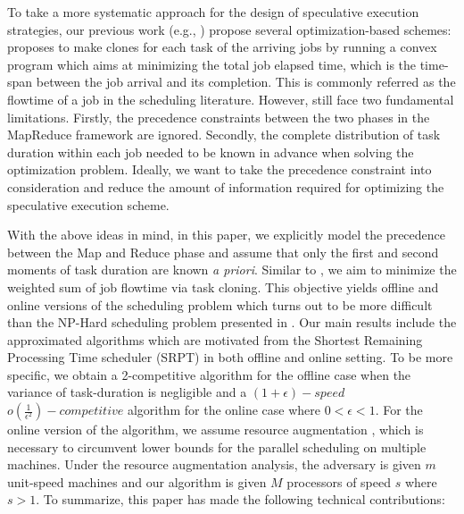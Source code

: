 \documentclass[10pt,conference,compsocconf,letterpaper]{IEEEtran}
\begin{document}
To take a more systematic
approach for the design of speculative execution strategies,
our previous work (e.g., \cite{speculative-single,speculative-single-optimization,speculative-multiple-optimization}) propose several optimization-based schemes:
 \cite{speculative-multiple-optimization} proposes to make clones for each task of the arriving jobs by running a convex program which aims at minimizing
the total job elapsed time, which is the time-span between the job arrival and its completion. This is commonly referred as the flowtime of a job in the scheduling literature. However, \cite{speculative-single,speculative-single-optimization,speculative-multiple-optimization} still
 face two fundamental limitations.   Firstly, the precedence constraints between the two phases in the MapReduce framework are ignored.
 Secondly, the complete distribution of task duration within each job needed to be known in advance when solving the optimization problem. 
 Ideally, we want to take the precedence
 constraint into consideration and reduce the amount of information required for optimizing the speculative execution scheme. 


With the above ideas in mind, in this paper, we explicitly model the precedence between the Map and Reduce phase and assume that only the first and second moments of task duration are known \textit{a priori}. Similar to \cite{speculative-multiple-optimization}, we aim to minimize the weighted sum of  job flowtime via task cloning. This objective yields 
offline and online versions of the scheduling problem which turns out to be more difficult than the NP-Hard scheduling problem presented in \cite{Schedulers}. Our main results include the approximated algorithms which are motivated from the Shortest Remaining Processing Time scheduler (SRPT) in both offline and online setting. To be more specific, we obtain a 2-competitive algorithm for the offline case
when the variance of task-duration is negligible and a $(1+\epsilon)-speed$ $o(\frac{1}{\epsilon^2})-competitive$ algorithm for the online case where $0 < \epsilon < 1$. For the online version of the algorithm, we assume resource augmentation \cite{speed}, which is necessary to circumvent lower bounds for the parallel scheduling on multiple machines. Under the resource augmentation analysis, the adversary is given $m$ unit-speed machines and our algorithm is given $M$ processors of speed $s$ where $s > 1$.
To summarize, this paper has made the following technical contributions:
\end{document}
